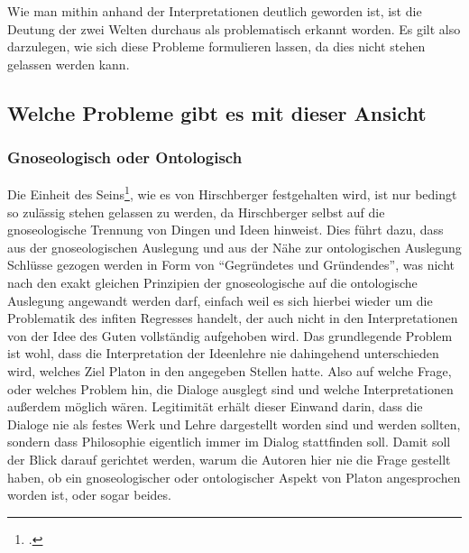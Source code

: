 Wie man mithin anhand der Interpretationen deutlich geworden ist, ist die Deutung der zwei Welten durchaus als problematisch erkannt worden. Es gilt also darzulegen, wie sich diese Probleme formulieren lassen, da dies nicht stehen gelassen werden kann. 


\subsection{Welche Probleme gibt es mit dieser Ansicht}
\subsubsection{Gnoseologisch oder Ontologisch}
Die Einheit des Seins\footcite[vgl.][S. 100]{Hirschberger}, wie es von Hirschberger festgehalten wird, ist nur bedingt so zulässig stehen gelassen zu werden, da Hirschberger selbst auf die gnoseologische Trennung von Dingen und Ideen hinweist. 
Dies führt dazu, dass aus der gnoseologischen Auslegung und aus der Nähe zur ontologischen Auslegung Schlüsse gezogen werden in Form von \enquote{Gegründetes und Gründendes}, was nicht nach den exakt gleichen Prinzipien der gnoseologische auf die ontologische Auslegung angewandt werden darf, einfach weil es sich hierbei wieder um die Problematik des infiten Regresses handelt, der auch nicht in den Interpretationen von der Idee des Guten vollständig aufgehoben wird.
Das grundlegende Problem ist wohl, dass die Interpretation der Ideenlehre nie dahingehend unterschieden wird, welches Ziel Platon in den angegeben Stellen hatte. Also auf welche Frage, oder welches Problem hin, die Dialoge ausglegt sind und welche Interpretationen außerdem möglich wären. Legitimität erhält dieser Einwand darin, dass die Dialoge nie als festes Werk und Lehre dargestellt worden sind und werden sollten, sondern dass Philosophie eigentlich immer im Dialog stattfinden soll. Damit soll der Blick darauf gerichtet werden, warum die Autoren hier nie die Frage gestellt haben, ob ein gnoseologischer oder ontologischer Aspekt von Platon angesprochen worden ist, oder sogar beides.\\  
